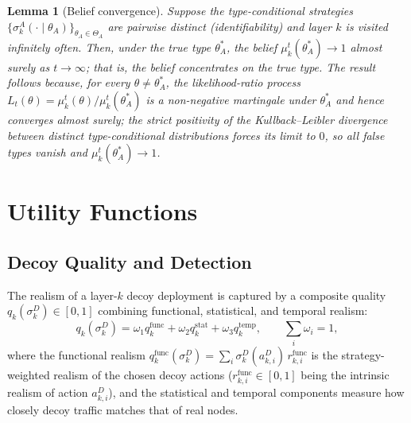 \documentclass[conference]{IEEEtran}
\newtheorem{lemma}{Lemma}
\begin{document}
\begin{lemma}[Belief convergence]
\label{lem:belief}
Suppose the type-conditional strategies
$\{\sigma_k^A(\cdot\mid\theta_A)\}_{\theta_A\in\Theta_A}$ are pairwise distinct
(\emph{identifiability}) and layer $k$ is visited infinitely often. Then, under
the true type $\theta_A^*$, the belief $\mu_k^t(\theta_A^*)\to 1$ almost surely
as $t\to\infty$; that is, the belief concentrates on the true type. The result
follows because, for every $\theta\neq\theta_A^*$, the likelihood-ratio process
$L_t(\theta)=\mu_k^t(\theta)/\mu_k^t(\theta_A^*)$ is a non-negative martingale
under $\theta_A^*$ and hence converges almost surely; the strict positivity of
the Kullback--Leibler divergence between distinct type-conditional
distributions forces its limit to $0$, so all false types vanish and
$\mu_k^t(\theta_A^*)\to 1$.
\end{lemma}

\section{Utility Functions}
\label{sec:utilities}

\subsection{Decoy Quality and Detection}

The realism of a layer-$k$ decoy deployment is captured by a composite quality
$q_k(\sigma_k^D)\in[0,1]$ combining functional, statistical, and temporal
realism:
\begin{equation}
q_k(\sigma_k^D) = \omega_1 q_k^{\mathrm{func}} + \omega_2 q_k^{\mathrm{stat}}
+ \omega_3 q_k^{\mathrm{temp}},
\qquad \textstyle\sum_i \omega_i = 1,
\label{eq:quality}
\end{equation}
where the functional realism $q_k^{\mathrm{func}}(\sigma_k^D)=\sum_i
 \sigma_k^D(a_{k,i}^D)\,r_{k,i}^{\mathrm{func}}$ is the strategy-weighted
realism of the chosen decoy actions ($r_{k,i}^{\mathrm{func}}\in[0,1]$ being the
intrinsic realism of action $a_{k,i}^D$), and the statistical and temporal
components measure how closely decoy traffic matches that of real nodes.
\end{document}
